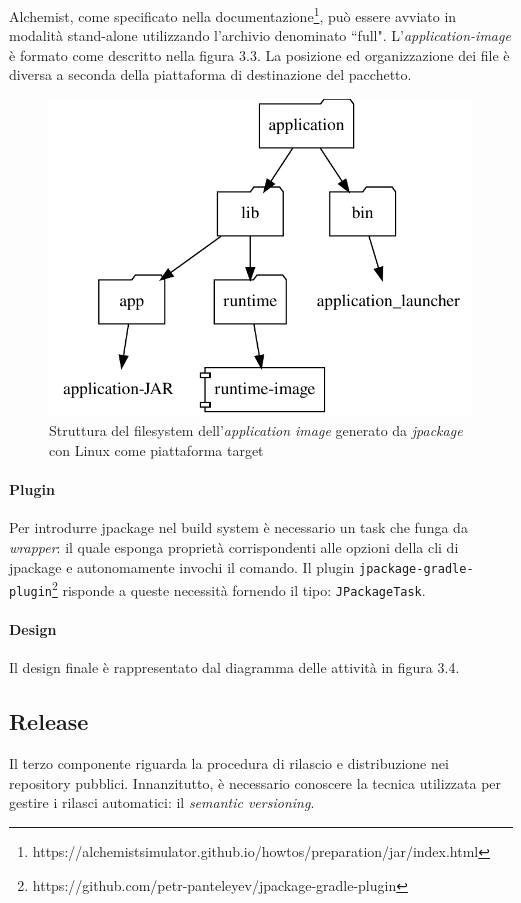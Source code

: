 Alchemist, come specificato nella documentazione\footnote{https://alchemistsimulator.github.io/howtos/preparation/jar/index.html}, può essere avviato in modalità stand-alone utilizzando l'archivio denominato ``full". L'\textit{application-image} è formato come descritto nella figura 3.3. La posizione ed organizzazione dei file è diversa a seconda della piattaforma di destinazione del pacchetto. 
\begin{figure}[H]
	\centering
	\includegraphics[width=.7\linewidth]{figures/application-image-folder-structure.pdf}
	\caption{Struttura del filesystem dell'\textit{application image} generato da \textit{jpackage} con Linux come piattaforma target}
	\label{fig:application-image-folder-structure}
\end{figure}

\paragraph{Plugin} Per introdurre jpackage nel build system è necessario un task che funga da \textit{wrapper}: il quale esponga proprietà corrispondenti alle opzioni della \ac{cli} di jpackage e autonomamente invochi il comando. Il plugin \texttt{jpackage-gradle-plugin}\footnote{https://github.com/petr-panteleyev/jpackage-gradle-plugin} risponde a queste necessità fornendo il tipo: \texttt{JPackageTask}. 


\paragraph{Design} Il design finale è rappresentato dal diagramma delle attività in figura 3.4.


\subsection{Release}
Il terzo componente riguarda la procedura di rilascio e distribuzione nei repository pubblici. Innanzitutto, è necessario conoscere la tecnica utilizzata per gestire i rilasci automatici: il \textit{semantic versioning}.

